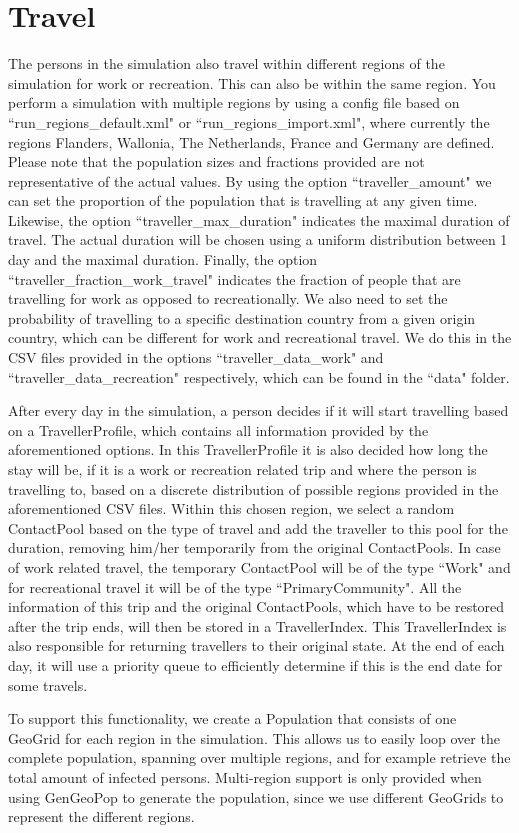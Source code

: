 
\section{Travel}
\label{section:travel}
The persons in the simulation also travel within different regions of the simulation for work or recreation.
This can also be within the same region. You perform a simulation with multiple regions by using a config file based on ``run\_regions\_default.xml" or ``run\_regions\_import.xml", where currently the regions Flanders, Wallonia, The Netherlands, France and Germany are defined. Please note that the population sizes and fractions provided are not representative of the actual values.
By using the option ``traveller\_amount" we can set the proportion of the population that is travelling at any given time.
Likewise, the option ``traveller\_max\_duration" indicates the maximal duration of travel. The actual duration will be chosen using a uniform distribution between 1 day and the maximal duration.
Finally, the option ``traveller\_fraction\_work\_travel" indicates the fraction of people that are travelling for work as opposed to recreationally.
We also need to set the probability of travelling to a specific destination country from a given origin country, which can be different for work and recreational travel.
We do this in the CSV files provided in the options ``traveller\_data\_work" and ``traveller\_data\_recreation" respectively, which can be found in the ``data" folder.

After every day in the simulation, a person decides if it will start travelling based on a TravellerProfile, which contains all information provided by the aforementioned options.
In this TravellerProfile it is also decided how long the stay will be, if it is a work or recreation related trip and where the person is travelling to, based on a discrete distribution of possible regions provided in the aforementioned CSV files. Within this chosen region, we select a random ContactPool based on the type of travel and add the traveller to this pool for the duration, removing him/her temporarily from the original ContactPools.
In case of work related travel, the temporary ContactPool will be of the type ``Work" and for recreational travel it will be of the type ``PrimaryCommunity".
All the information of this trip and the original ContactPools, which have to be restored after the trip ends, will then be stored in a TravellerIndex.
This TravellerIndex is also responsible for returning travellers to their original state.
At the end of each day, it will use a priority queue to efficiently determine if this is the end date for some travels.

To support this functionality, we create a Population that consists of one GeoGrid for each region in the simulation. This allows us to easily loop over the complete population, spanning over multiple regions, and for example retrieve the total amount of infected persons. Multi-region support is only provided when using GenGeoPop to generate the population, since we use different GeoGrids to represent the different regions.
